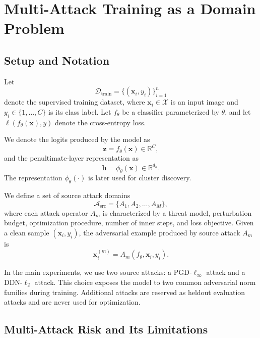 \section{Multi-Attack Training as a Domain Problem}
\label{sec:ch4_problem_formulation}

\subsection{Setup and Notation}

Let
\begin{equation}
    \mathcal{D}_{\mathrm{train}}
    =
    \{(\mathbf{x}_i, y_i)\}_{i=1}^{n}
\end{equation}
denote the supervised training dataset, where \(\mathbf{x}_i \in \mathcal{X}\) is an
input image and \(y_i \in \{1,\ldots,C\}\) is its class label. Let \(f_\theta\) be a
classifier parameterized by \(\theta\), and let
\(\ell(f_\theta(\mathbf{x}),y)\) denote the cross-entropy loss.

We denote the logits produced by the model as
\[
    \mathbf{z} = f_\theta(\mathbf{x}) \in \mathbb{R}^{C},
\]
and the penultimate-layer representation as
\[
    \mathbf{h} = \phi_\theta(\mathbf{x}) \in \mathbb{R}^{d_h}.
\]
The representation \(\phi_\theta(\cdot)\) is later used for cluster discovery.

We define a set of source attack domains
\begin{equation}
    \mathcal{A}_{\mathrm{src}}
    =
    \{A_1,A_2,\ldots,A_M\},
\end{equation}
where each attack operator \(A_m\) is characterized by a threat model, perturbation
budget, optimization procedure, number of inner steps, and loss objective. Given a
clean sample \((\mathbf{x}_i,y_i)\), the adversarial example produced by source attack
\(A_m\) is
\begin{equation}
    \mathbf{x}_i^{(m)}
    =
    A_m(f_\theta,\mathbf{x}_i,y_i).
\end{equation}

In the main experiments, we use two source attacks: a PGD-\(\ell_\infty\) attack and
a DDN-\(\ell_2\) attack. This choice exposes the model to two common adversarial norm
families during training. Additional attacks are reserved as heldout evaluation attacks
and are never used for optimization.

\subsection{Multi-Attack Risk and Its Limitations}

